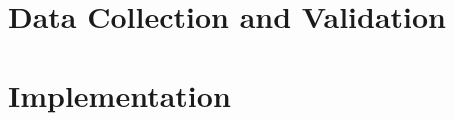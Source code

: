 \documentclass[a4paper, 11pt, oneside]{Thesis}  %
\begin{document}
\frontmatter      %






% 

% 













% 

% 

% 



\mainmatter	  %
\pagestyle{fancy}  %






\part{Data Collection and Validation}


\part{Implementation}


\end{document}
